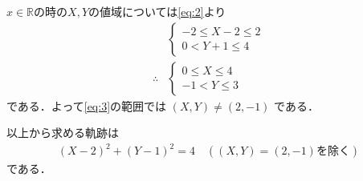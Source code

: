 \documentclass[../../main.tex]{subfiles}
\begin{document}
$x \in \mathbb{R}$の時の$X,Y$の値域については\cref{eq:2}より
\begin{align}
  &
  \begin{cases}
    -2 \le X-2 \le 2 \\
    0 < Y+1 \le 4
  \end{cases} \\
  \therefore
  &
  \begin{cases}
    0 \le X \le 4\\
    -1 < Y \le 3
  \end{cases}
\end{align}
である．よって\cref{eq:3}の範囲では $(X, Y) \ne (2, -1)$ である．

以上から求める軌跡は
\begin{align}
  (X-2)^2 + (Y-1)^2 = 4 \quad ((X, Y)=(2, -1) \text{を除く})
\end{align}
である．
\end{document}
